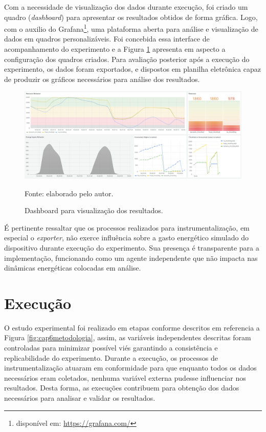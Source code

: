 Com a necessidade de visualização dos dados durante execução, foi criado um quadro (\textit{dashboard}) para apresentar os resultados obtidos de forma gráfica. Logo, com o auxilio do Grafana\footnote{disponível em: \url{https://grafana.com/}}, uma plataforma aberta para análise e visualização de dados em quadros personalizáveis. Foi concebida essa interface de acompanhamento do experimento e a Figura \ref{fig:cap6bashboard} apresenta em aspecto a configuração dos quadros criados. Para avaliação posterior após a execução do experimento, os dados foram exportados, e dispostos em planilha eletrônica capaz de produzir os gráficos necessários para análise dos resultados. 

\begin{figure}[H]
	\centering
	
	\caption{Dashboard para visualização dos resultados.}
	\label{fig:cap6bashboard}
	\noindent\includegraphics[width=1\linewidth]{Imagens/cap6/cap6dashboard.png} 
	
	Fonte: elaborado pelo autor.
\end{figure}

É pertinente ressaltar que os processos realizados para instrumentalização, em especial o \textit{exporter}, não exerce influência sobre a gasto energético simulado do dispositivo durante execução do experimento. Sua presença é transparente para a implementação, funcionando como um agente independente que não impacta nas dinâmicas energéticas colocadas em análise.

\section{Execução}
\label{cap6:execucao}

O estudo experimental foi realizado em etapas conforme descritos em referencia a Figura \ref{fig:cap6metodologia}, assim, as variáveis independentes descritas foram controladas para minimizar possível viés garantindo a consistência e replicabilidade do experimento. Durante a execução, os processos de instrumentalização atuaram em conformidade para que enquanto todos os dados necessários eram coletados, nenhuma variável externa pudesse influenciar nos resultados. Desta forma, as execuções contribuem para obtenção dos dados necessários para analisar e validar os resultados.

